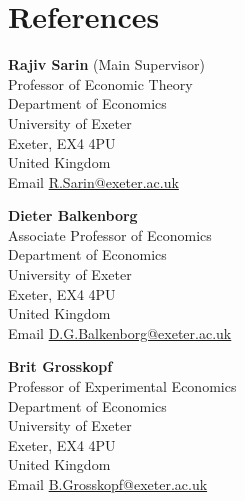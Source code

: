 \documentclass[letterpaper,11pt]{article}
\renewenvironment{itemize}{
\begin{list}{}{
\setlength{\leftmargin}{1.5em}
}
}{
\end{list}
}
\begin{document}
\section*{References}
\begin{spacing}{1.1}
\begin{itemize}
\item {\large \bf Rajiv Sarin} (Main Supervisor)\\
Professor of Economic Theory\\
Department of Economics\\
University of Exeter\\
Exeter, EX4 4PU\\
United Kingdom\\
Email \href{mailto:R.Sarin@exeter.ac.uk}{\color{blue}R.Sarin@exeter.ac.uk}
\vspace{0.1in}
\item {\large \bf Dieter Balkenborg}\\
Associate Professor of Economics\\
Department of Economics\\
University of Exeter\\
Exeter, EX4 4PU\\
United Kingdom\\
Email \href{mailto:D.G.Balkenborg@exeter.ac.uk}{\color{blue}D.G.Balkenborg@exeter.ac.uk}
\vspace{0.1in}
\item {\large \bf Brit Grosskopf}\\
Professor of Experimental Economics\\
Department of Economics\\
University of Exeter\\
Exeter, EX4 4PU\\
United Kingdom\\
Email \href{mailto:B.Grosskopf@bham.ac.uk}{\color{blue}B.Grosskopf@exeter.ac.uk}
\end{itemize}
\end{spacing}
\end{document}
